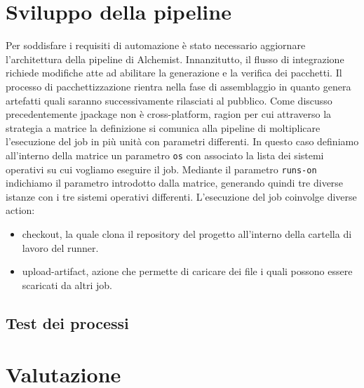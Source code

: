 \section{Sviluppo della pipeline}

Per soddisfare i requisiti di automazione è stato necessario aggiornare l'architettura della pipeline di Alchemist. Innanzitutto, il flusso di integrazione richiede modifiche atte ad abilitare la generazione e la verifica dei pacchetti. Il processo di pacchettizzazione rientra nella fase di assemblaggio in quanto genera artefatti quali saranno successivamente rilasciati al pubblico. Come discusso precedentemente jpackage non è cross-platform, ragion per cui attraverso la strategia a matrice la definizione si comunica alla pipeline di moltiplicare l'esecuzione del job in più unità con parametri differenti. In questo caso definiamo all'interno della matrice un parametro \texttt{os} con associato la lista dei sistemi operativi su cui vogliamo eseguire il job. Mediante il parametro \texttt{runs-on} indichiamo il parametro introdotto dalla matrice, generando quindi tre diverse istanze con i tre sistemi operativi differenti. 
L'esecuzione del job coinvolge diverse action: 
\begin{itemize}
	\item checkout, la quale clona il repository del progetto all'interno della cartella di lavoro del runner.
	\item upload-artifact, azione che permette di caricare dei file i quali possono essere scaricati da altri job.
\end{itemize}




\subsection{Test dei processi}


\section{Valutazione}
